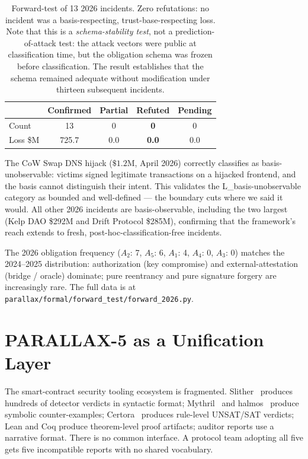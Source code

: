 \documentclass[11pt,a4paper]{article}
\begin{document}
\begin{table}[h]
\centering
\small
\begin{tabular}{lcccc}
\toprule
& Confirmed & Partial & Refuted & Pending \\
\midrule
Count   & 13 & 0 & \textbf{0} & 0 \\
Loss \$M & 725.7 & 0.0 & \textbf{0.0} & 0.0 \\
\bottomrule
\end{tabular}
\caption{Forward-test of 13 2026 incidents. Zero refutations: no incident was a basis-respecting, trust-base-respecting loss. Note that this is a \emph{schema-stability test}, not a prediction-of-attack test: the attack vectors were public at classification time, but the obligation schema was frozen before classification. The result establishes that the schema remained adequate without modification under thirteen subsequent incidents.}\label{tab:forward-test}
\end{table}

The CoW Swap DNS hijack ($\$1.2$M, April 2026) correctly classifies as basis-unobservable: victims signed legitimate transactions on a hijacked frontend, and the basis cannot distinguish their intent. This validates the L\_basis-unobservable category as bounded and well-defined — the boundary cuts where we said it would. All other 2026 incidents are basis-observable, including the two largest (Kelp DAO \$292M and Drift Protocol \$285M), confirming that the framework's reach extends to fresh, post-hoc-classification-free incidents.

The 2026 obligation frequency ($A_2$: 7, $A_5$: 6, $A_1$: 4, $A_4$: 0, $A_3$: 0) matches the 2024--2025 distribution: authorization (key compromise) and external-attestation (bridge / oracle) dominate; pure reentrancy and pure signature forgery are increasingly rare. The full data is at \texttt{parallax/formal/forward\_test/forward\_2026.py}.

\section{PARALLAX-5 as a Unification Layer}\label{sec:unification}

The smart-contract security tooling ecosystem is fragmented. Slither~\cite{slither} produces hundreds of detector verdicts in syntactic format; Mythril~\cite{mythril} and halmos~\cite{halmos} produce symbolic counter-examples; Certora~\cite{certora} produces rule-level UNSAT/SAT verdicts; Lean and Coq produce theorem-level proof artifacts; auditor reports use a narrative format. There is no common interface. A protocol team adopting all five gets five incompatible reports with no shared vocabulary.
\end{document}
